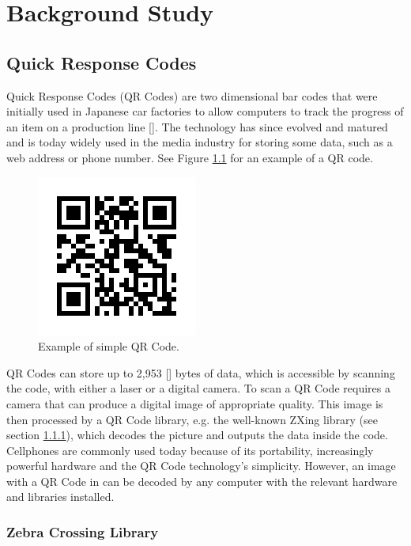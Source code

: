 \chapter{Background Study}

\section{Quick Response Codes}

Quick Response Codes (QR Codes) are two dimensional bar codes that were initially
 used in Japanese car factories to allow computers to track the progress of
 an item on a production line [\cite{website:denso-qrcode}]. The technology has
 since evolved and matured and is today widely used in the media industry for storing some
 data, such as a web address or phone number. See Figure \ref{qrcode} for an example of a QR
 code.
 
\begin{figure}[h]
\centering
\includegraphics[scale = 0.7]{qrcode_voorbeeld.png}
\caption{Example of simple QR Code.}
\label{qrcode}
\end{figure}
 
 QR Codes can store up to 2,953 [\cite{website:denso-qrcode}] bytes of
 data, which is accessible by scanning the code, with either a laser or a
 digital camera. To scan a QR Code requires a camera that can produce a
 digital image of appropriate quality. This image is then processed by a QR Code library, e.g. the
 well-known ZXing library (see section \ref{sec:zbar}), which decodes the picture and outputs
 the data inside the code. Cellphones are commonly used today because of its portability,
 increasingly powerful hardware and the QR Code technology's simplicity.
 However, an image with a QR Code in can be decoded by any computer with the relevant hardware
 and libraries installed.

\subsection{Zebra Crossing Library}
\label{sec:zbar}

